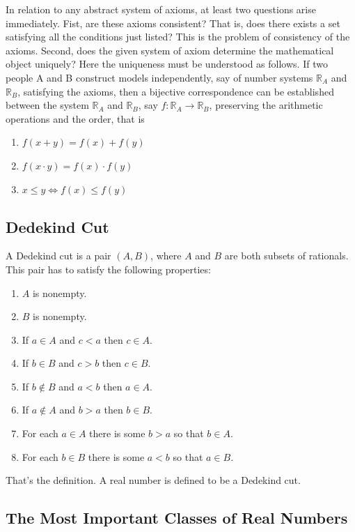 \documentclass[a4paper,12pt]{article} %
\begin{document}
In relation to any abstract system of axioms, at least two questions
arise immediately.
Fist, are these axioms consistent? That is, does there exists a set 
satisfying all the conditions just listed? This is the problem of 
consistency of the axioms.
Second, does the given system of axiom determine the mathematical 
object uniquely?  Here the uniqueness must be understood as follows.
If two people A and B construct models independently, say of number 
systems $\mathbb{R}_A$ and $\mathbb{R}_B$, satisfying the axioms, then a 
bijective correspondence can be established between the system 
$\mathbb{R}_A$ and $\mathbb{R}_B$, say $\displaystyle f: \mathbb{R}_A \to 
\mathbb{R}_B$, preserving the arithmetic operations and the order, that 
is 
\begin{enumerate}
    \item $\displaystyle f(x+y) = f(x) + f(y)$
    \item $\displaystyle f(x \cdot y) = f(x)\cdot f(y)$ 
    \item $\displaystyle x \le y \iff f(x) \le f(y)$ 
\end{enumerate}

\subsection{Dedekind Cut}
A Dedekind cut is a pair $\displaystyle (A, B)$, where $A$
and $B$ are both subsets of rationals. This pair has to satisfy 
the following properties:
\begin{enumerate}[label={\rm(\arabic*)}]
    \item $A$ is nonempty.
    \item $B$ is nonempty.
    \item If $a \in A$ and $c < a$ then $c \in A$.
    \item If $b \in B$ and $c > b$ then $c \in B$.
    \item If $b \notin B$ and $a < b$ then $a \in A$.
    \item If $a \notin A$ and $b > a$ then $b \in B$.
    \item For each $a \in A$ there is some $b > a$ so that $b \in A$.
    \item For each $b \in B$ there is some $a < b$ so that $a \in B$.
\end{enumerate}
That's the definition. A real number is defined to be a Dedekind cut.

\subsection{The Most Important Classes of Real Numbers}
\end{document}
